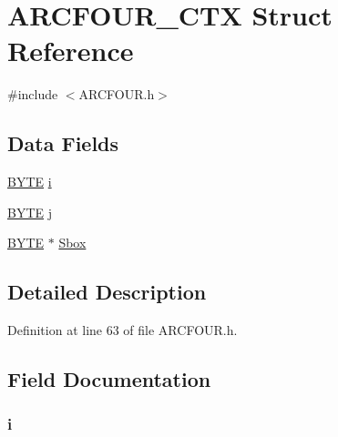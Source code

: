 \hypertarget{struct_a_r_c_f_o_u_r___c_t_x}{}\section{A\+R\+C\+F\+O\+U\+R\+\_\+\+C\+T\+X Struct Reference}
\label{struct_a_r_c_f_o_u_r___c_t_x}


{\ttfamily \#include $<$A\+R\+C\+F\+O\+U\+R.\+h$>$}

\subsection*{Data Fields}
\begin{DoxyCompactItemize}
\item 
\hyperlink{_generic_type_defs_8h_a4ae1dab0fb4b072a66584546209e7d58}{B\+Y\+T\+E} \hyperlink{struct_a_r_c_f_o_u_r___c_t_x_a66f11437dd99d93f3e6c25dc3da62448}{i}
\item 
\hyperlink{_generic_type_defs_8h_a4ae1dab0fb4b072a66584546209e7d58}{B\+Y\+T\+E} \hyperlink{struct_a_r_c_f_o_u_r___c_t_x_adf3ec87d99134b28195e674943a02d46}{j}
\item 
\hyperlink{_generic_type_defs_8h_a4ae1dab0fb4b072a66584546209e7d58}{B\+Y\+T\+E} $\ast$ \hyperlink{struct_a_r_c_f_o_u_r___c_t_x_a6cb957a7a561db9bdb4d22d191aa59ee}{Sbox}
\end{DoxyCompactItemize}


\subsection{Detailed Description}


Definition at line 63 of file A\+R\+C\+F\+O\+U\+R.\+h.



\subsection{Field Documentation}
\hypertarget{struct_a_r_c_f_o_u_r___c_t_x_a66f11437dd99d93f3e6c25dc3da62448}{}
\subsubsection[{i}]{ i}\label{struct_a_r_c_f_o_u_r___c_t_x_a66f11437dd99d93f3e6c25dc3da62448}


